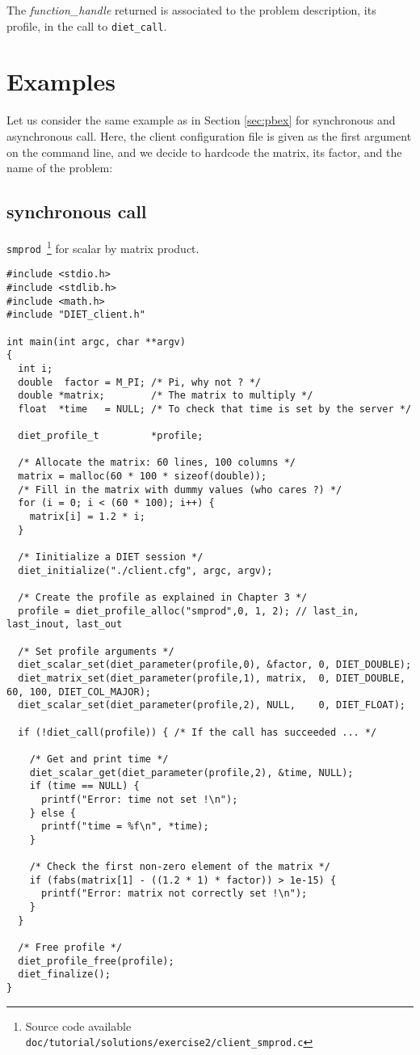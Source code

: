 The \emph{function\_handle} returned is associated to the problem description,
its profile, in the call to \texttt{diet\_call}.

\section{Examples}
\label{sec:cl_ex}

Let us consider the same example as in Section \ref{sec:pbex} for synchronous 
and asynchronous call.  Here, the client configuration file is given as the 
first argument on the command line, and we decide to hardcode the matrix,
its factor, and the name of the problem:

\subsection{synchronous call}
\texttt{smprod}~\footnote{Source code available \texttt{doc/tutorial/solutions/exercise2/client\_smprod.c}} for scalar by matrix product.

{\footnotesize
\begin{verbatim}
#include <stdio.h>
#include <stdlib.h>
#include <math.h>
#include "DIET_client.h"

int main(int argc, char **argv)
{
  int i;
  double  factor = M_PI; /* Pi, why not ? */
  double *matrix;        /* The matrix to multiply */
  float  *time   = NULL; /* To check that time is set by the server */

  diet_profile_t         *profile;

  /* Allocate the matrix: 60 lines, 100 columns */
  matrix = malloc(60 * 100 * sizeof(double));
  /* Fill in the matrix with dummy values (who cares ?) */
  for (i = 0; i < (60 * 100); i++) {
    matrix[i] = 1.2 * i;
  }
  
  /* Iinitialize a DIET session */
  diet_initialize("./client.cfg", argc, argv);

  /* Create the profile as explained in Chapter 3 */
  profile = diet_profile_alloc("smprod",0, 1, 2); // last_in, last_inout, last_out
  
  /* Set profile arguments */
  diet_scalar_set(diet_parameter(profile,0), &factor, 0, DIET_DOUBLE);
  diet_matrix_set(diet_parameter(profile,1), matrix,  0, DIET_DOUBLE, 60, 100, DIET_COL_MAJOR);
  diet_scalar_set(diet_parameter(profile,2), NULL,    0, DIET_FLOAT);
  
  if (!diet_call(profile)) { /* If the call has succeeded ... */
     
    /* Get and print time */
    diet_scalar_get(diet_parameter(profile,2), &time, NULL);
    if (time == NULL) {
      printf("Error: time not set !\n");
    } else {
      printf("time = %f\n", *time);
    }

    /* Check the first non-zero element of the matrix */
    if (fabs(matrix[1] - ((1.2 * 1) * factor)) > 1e-15) {
      printf("Error: matrix not correctly set !\n");
    }
  }

  /* Free profile */
  diet_profile_free(profile);
  diet_finalize();
}
\end{verbatim}
}


